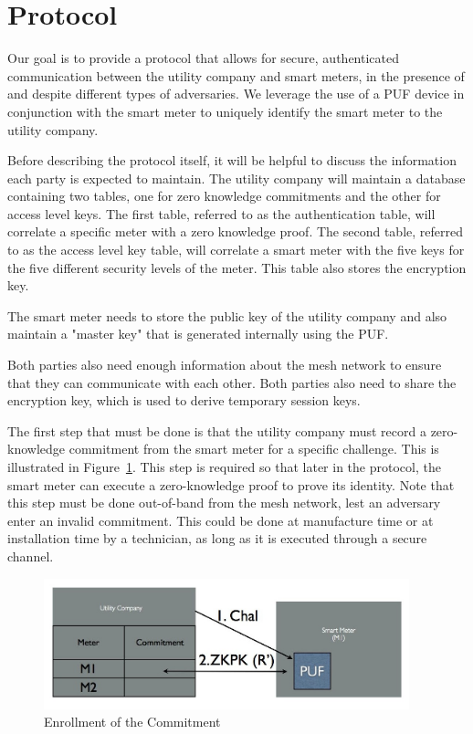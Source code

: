 \section{Protocol}
Our goal is to provide a protocol that allows for secure, authenticated communication between the utility company and
smart meters, in the presence of and despite different types of adversaries.
We leverage the use of a PUF device in conjunction with the smart meter to uniquely identify the smart meter to the
utility company.

Before describing the protocol itself, it will be helpful to discuss the information each party is expected to maintain.
The utility company will maintain a database containing two tables, one for zero knowledge commitments and the 
other for 
access level keys. The first table, referred to as the authentication table, will correlate a specific meter with a zero knowledge proof.
The second table, referred to as the access level key table, will correlate a smart meter with the five keys for the five different security levels of the 
meter. This table also stores the encryption key.

The smart meter needs to store the public key of the utility company and also maintain a "master key"
that is generated internally using the PUF. 

Both parties also need enough information about
the mesh network to ensure that they can communicate with each other. Both parties also need to share the
encryption key, which is used to derive temporary session keys.

The first step that must be done is that the utility company must record a zero-knowledge commitment from the 
smart meter for a specific challenge. This is illustrated in Figure~\ref{fig:doeconfig}. This step is required so that later
in the protocol, the smart meter can execute a zero-knowledge proof to prove its identity.
Note that this step must be done out-of-band from the mesh network, lest an adversary enter an invalid commitment.
This could be done at manufacture time or at installation time by a technician, as long as it is executed through a secure channel.

\begin{figure}[!ht]
\centering
\includegraphics[width=400px]{images/doe_auth_config.jpg}
\caption{Enrollment of the Commitment}
\label{fig:doeconfig}
\end{figure}
\FloatBarrier

